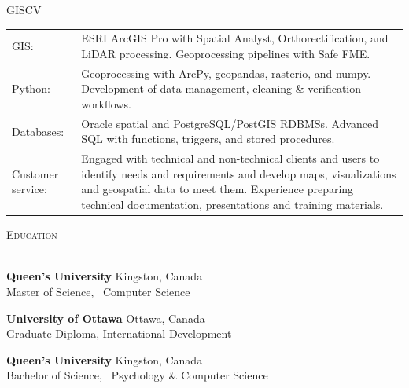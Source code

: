 \documentclass[letterpaper]{article}
\newcommand{\lineunder} {
        \vspace*{-8pt} \\
        \hspace*{-18pt} \hrulefill \\
    }
\newcommand{\header} [1] {
        \vspace{10pt}
        {\hspace*{-18pt}\vspace*{6pt} \textsc{#1}}
        \vspace*{-6pt} \lineunder
        \vspace{3pt}
    }
\newcommand{\university}[3]{
        \textbf{#1}  %
        \hfill #2\\  %
        #3\\         %
        \vspace{2mm}
    }
\newenvironment{skillslist}
        {
            \begin{tabular}[t]{ l L{5.17in} }
        }{
            \end{tabular}
        }
\begin{document}
    \begin{taggedblock}{GISCV}
        \begin{skillslist}
            GIS:& 
                ESRI ArcGIS Pro with Spatial Analyst, Orthorectification, and LiDAR processing.
                Geoprocessing pipelines with Safe FME.
                \\
            Python:& 
                Geoprocessing with ArcPy, geopandas, rasterio, and numpy.
                Development of data management, cleaning \& verification workflows. 
                \\
             Databases:& 
                 Oracle spatial and PostgreSQL/PostGIS RDBMSs. 
                 Advanced SQL with functions, triggers, and stored procedures.
                 \\
            Customer service: &
                Engaged with technical and non-technical clients and users
                to identify needs and requirements and develop maps, visualizations
                and geospatial data to meet them. 
                Experience preparing technical documentation,
                presentations and training materials.
                \\
        \end{skillslist}
    \end{taggedblock}



\header{Education}
    \university
        {Queen's University}
        {Kingston, Canada}
        {Master of Science, ~Computer Science}

    \university
        {University of Ottawa}
        {Ottawa, Canada}
        {Graduate Diploma, International Development}

    \university
        {Queen's University}
        {Kingston, Canada}
        {Bachelor of Science, ~Psychology \& Computer Science}
\end{document}
